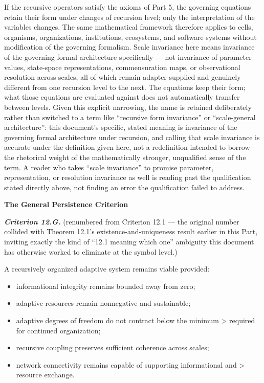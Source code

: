 \documentclass[
]{article}
\begin{document}
If the recursive operators satisfy the axioms of Part 5, the governing
equations retain their form under changes of recursion level; only the
interpretation of the variables changes. The same mathematical framework
therefore applies to cells, organisms, organizations, institutions,
ecosystems, and software systems without modification of the governing
formalism. Scale invariance here means invariance of the governing
formal architecture specifically --- not invariance of parameter values,
state-space representations, commensuration maps, or observational
resolution across scales, all of which remain adapter-supplied and
genuinely different from one recursion level to the next. The equations
keep their form; what those equations are evaluated against does not
automatically transfer between levels. Given this explicit narrowing,
the name is retained deliberately rather than switched to a term like
``recursive form invariance'' or ``scale-general architecture'': this
document's specific, stated meaning is invariance of the governing
formal architecture under recursion, and calling that scale invariance
is accurate under the definition given here, not a redefinition intended
to borrow the rhetorical weight of the mathematically stronger,
unqualified sense of the term. A reader who takes ``scale invariance''
to promise parameter, representation, or resolution invariance as well
is reading past the qualification stated directly above, not finding an
error the qualification failed to address.

\textbf{The General Persistence Criterion}

\emph{\textbf{Criterion 12.G.}} (renumbered from Criterion 12.1 --- the
original number collided with Theorem 12.1's existence-and-uniqueness
result earlier in this Part, inviting exactly the kind of ``12.1 meaning
which one'' ambiguity this document has otherwise worked to eliminate at
the symbol level.)

A recursively organized adaptive system remains viable provided:

\begin{itemize}
\item
  informational integrity remains bounded away from zero;
\item
  adaptive resources remain nonnegative and sustainable;
\item
  adaptive degrees of freedom do not contract below the minimum
  \textgreater{} required for continued organization;
\item
  recursive coupling preserves sufficient coherence across scales;
\item
  network connectivity remains capable of supporting informational and
  \textgreater{} resource exchange.
\end{itemize}
\end{document}
